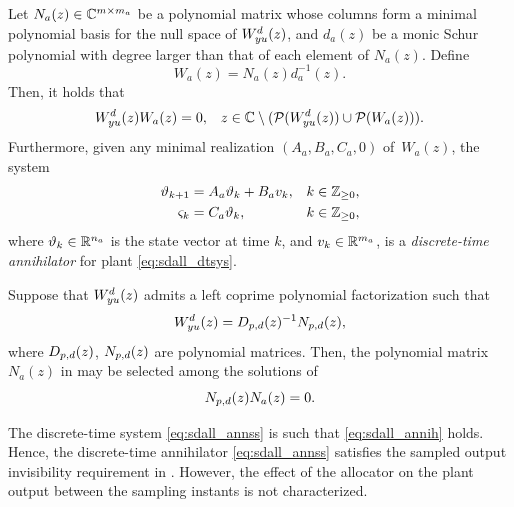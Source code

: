 \begin{proposition}
  \label{prop:sdall_annih_computation}
  Let $N_a(z)\in\mathbb{C}^{m\times m_a}$ be a polynomial matrix whose columns form a minimal polynomial basis for the null space of $W_{yu}^{d}(z)$, and $d_a(z)$ be a monic Schur polynomial with degree larger than that of each element of $N_a(z)$.
  Define
  \begin{equation}
    \label{eq:sdall_Wa}
    W_a(z) = N_a(z)d_a^{-1}(z).
  \end{equation}
  Then, it holds that
  \begin{align}
    \label{eq:sdall_annih}
    W_{yu}^{d}(z)W_a(z) &= 0, & z\in\mathbb{C}\setminus(\operatorname{\mathcal{P}}(W_{yu}^{d}(z))\cup\operatorname{\mathcal{P}}(W_a(z))).
  \end{align}
  Furthermore, given any minimal realization $(A_a,B_a,C_a,0)$ of $\,W_a(z)$, the system
  \begin{align}
    \label{eq:sdall_annss}
    \vartheta_{k+1} &= A_a \vartheta_k + B_a v_k, & k\in\mathbb{Z}_{\geq 0},\\
    \varsigma_k &= C_a \vartheta_k, & k\in\mathbb{Z}_{\geq 0},
  \end{align}
  where $\vartheta_k\in\mathbb{R}^{n_a}$ is the state vector at time $k$, and $v_k\in\mathbb{R}^{m_a}$, is a \emph{discrete-time annihilator} for plant \eqref{eq:sdall_dtsys}.

  \closestatement
\end{proposition}

\begin{remark}
  \label{rem:sdall_lcf}
  Suppose that $W_{yu}^{d}(z)$ admits a left coprime polynomial factorization \cite[§7.8]{chen_linear_2009} such that
  \begin{equation}
    \label{eq:sdall_lcf}
    W_{yu}^{d}(z) = D_{p,d}(z)^{-1}N_{p,d}(z),
  \end{equation}
  where $D_{p,d}(z)$, $N_{p,d}(z)$ are polynomial matrices.
  Then, the polynomial matrix $N_a(z)$ in  may be selected among the solutions of
  \begin{equation}
    \label{eq:sdall_lcf_annih}
    N_{p,d}(z)N_a(z) = 0.
  \end{equation}
  \closeremark
\end{remark}

\begin{remark}
  \label{rem:sdall_sdinv}
  The discrete-time system \eqref{eq:sdall_annss} is such that \eqref{eq:sdall_annih} holds. Hence, the discrete-time annihilator \eqref{eq:sdall_annss} satisfies the sampled output invisibility requirement in . However, the effect of the allocator on the plant output between the sampling instants is not characterized.\closeremark
\end{remark}

